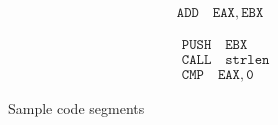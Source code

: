 \begin{figure}[t]
\scriptsize
  \begin{subfigure}[b]{0.4\linewidth}
  \begin{equation}
  \boxed{
\begin{aligned}
 \mathtt{ADD \quad EAX,EBX}
\end{aligned}}
\end{equation}
   \label{fig:seg1}
  \end{subfigure}%
  \begin{subfigure}[b]{0.4\linewidth}
   \begin{equation}
   \boxed{
\begin{aligned}
 &\mathtt{PUSH \quad EBX} \\
 &\mathtt{CALL \quad strlen} \\
 &\mathtt{CMP \quad EAX,0}
\end{aligned}}
\end{equation}
    \label{fig:seg1}
  \end{subfigure}%
  \caption{Sample code segments}
  \label{fig:code_seg}
\end{figure}
